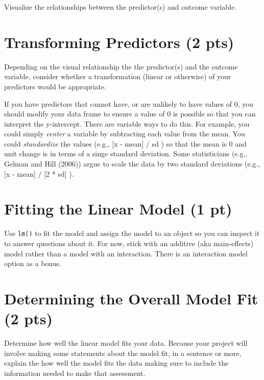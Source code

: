 \documentclass[
]{article}
\begin{document}
Visualize the relationships between the predictor(s) and outcome
variable.

\hypertarget{transforming-predictors-2-pts}{%
\section{\texorpdfstring{\textbf{Transforming Predictors} (2
pts)}{Transforming Predictors (2 pts)}}\label{transforming-predictors-2-pts}}

Depending on the visual relationship the the predictor(s) and the
outcome variable, consider whether a transformation (linear or
otherwise) of your predictors would be appropriate.

If you have predictors that cannot have, or are unlikely to have values
of 0, you should modify your data frame to ensure a value of 0 is
possible so that you can interpret the y-intercept. There are variable
ways to do this. For example, you could simply \emph{center} a variable
by subtracting each value from the mean. You could \emph{standardize}
the values (e.g., {[}x - mean{]} / sd ) so that the mean is 0 and unit
change is in terms of a singe standard deviation. Some statisticians
(e.g., Gelman and Hill (2006)) argue to scale the data by two standard
deviations (e.g., {[}x - mean{]} / {[}2 * sd{]} ).

\hypertarget{fitting-the-linear-model-1-pt}{%
\section{\texorpdfstring{\textbf{Fitting the Linear Model} (1
pt)}{Fitting the Linear Model (1 pt)}}\label{fitting-the-linear-model-1-pt}}

Use \texttt{lm()} to fit the model and assign the model to an object so
you can inspect it to answer questions about it. For now, stick with an
additive (aka main-effects) model rather than a model with an
interaction. There is an interaction model option as a bonus.

\hypertarget{determining-the-overall-model-fit-2-pts}{%
\section{\texorpdfstring{\textbf{Determining the Overall Model Fit} (2
pts)}{Determining the Overall Model Fit (2 pts)}}\label{determining-the-overall-model-fit-2-pts}}

Determine how well the linear model fits your data. Because your project
will involve making some statements about the model fit, in a sentence
or more, explain the how well the model fits the data making sure to
include the information needed to make that assessment.
\end{document}
